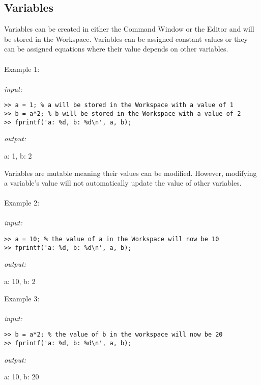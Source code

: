 \documentclass[../MATLAB_Primer.tex]{subfiles}
\begin{document}
\subsection{Variables}
    Variables can be created in either the Command Window or the Editor and will be stored in the Workspace. Variables can be assigned constant values or they can be assigned equations where their value depends on other variables.
\\ \\
Example 1:
\\ \\
\textit{input:}
\begin{lstlisting}[frame=single]
>> a = 1; % a will be stored in the Workspace with a value of 1
>> b = a*2; % b will be stored in the Workspace with a value of 2
>> fprintf('a: %d, b: %d\n', a, b);
\end{lstlisting}

\textit{output:}

\begin{center}
    a: 1, b: 2
\end{center}

Variables are mutable meaning their values can be modified. However, modifying a variable's value will not automatically update the value of other variables.
\\ \\
Example 2:
\\ \\
\textit{input:}
\begin{lstlisting}[frame=single]
>> a = 10; % the value of a in the Workspace will now be 10
>> fprintf('a: %d, b: %d\n', a, b);
\end{lstlisting}

\textit{output:}

\begin{center}
    a: 10, b: 2
\end{center}

Example 3:
\\ \\
\textit{input:}
\begin{lstlisting}[frame=single]
>> b = a*2; % the value of b in the workspace will now be 20
>> fprintf('a: %d, b: %d\n', a, b);
\end{lstlisting}

\textit{output:}

\begin{center}
    a: 10, b: 20
\end{center}
\end{document}
